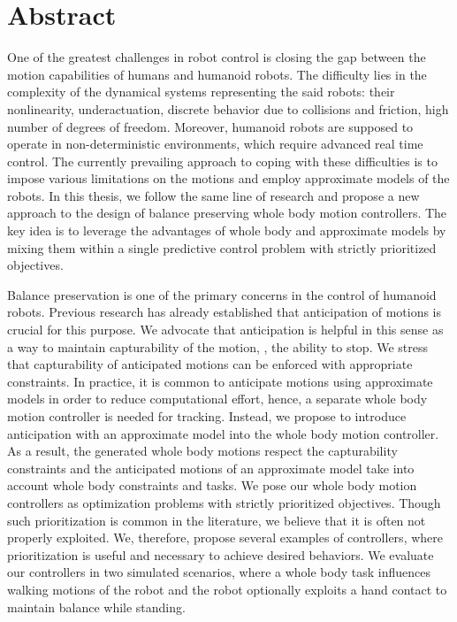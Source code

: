

\cleardoublepage
{}
{}
\chapter*{Abstract}

One of the greatest challenges in robot control is closing the gap between the
motion capabilities of humans and humanoid robots. The difficulty lies in the
complexity of the dynamical systems representing the said robots: their
nonlinearity, underactuation, discrete behavior due to collisions and friction,
high number of degrees of freedom. Moreover, humanoid robots are supposed to
operate in non-deterministic environments, which require advanced real time
control. The currently prevailing approach to coping with these difficulties is
to impose various limitations on the motions and employ approximate models of
the robots. In this thesis, we follow the same line of research and propose a
new approach to the design of balance preserving whole body motion controllers.
The key idea is to leverage the advantages of whole body and approximate models
by mixing them within a single predictive control problem with strictly
prioritized objectives.


Balance preservation is one of the primary concerns in the control of humanoid
robots. Previous research has already established that anticipation of motions
is crucial for this purpose. We advocate that anticipation is helpful in this
sense as a way to maintain capturability of the motion, \IE, the ability to
stop. We stress that capturability of anticipated motions can be enforced with
appropriate constraints. In practice, it is common to anticipate motions using
approximate models in order to reduce computational effort, hence, a separate
whole body motion controller is needed for tracking. Instead, we propose to
introduce anticipation with an approximate model into the whole body motion
controller. As a result, the generated whole body motions respect the
capturability constraints and the anticipated motions of an approximate model
take into account whole body constraints and tasks. We pose our whole body
motion controllers as optimization problems with strictly prioritized
objectives. Though such prioritization is common in the literature, we believe
that it is often not properly exploited. We, therefore, propose several
examples of controllers, where prioritization is useful and necessary to
achieve desired behaviors. We evaluate our controllers in two simulated
scenarios, where a whole body task influences walking motions of the robot and
the robot optionally exploits a hand contact to maintain balance while
standing.


